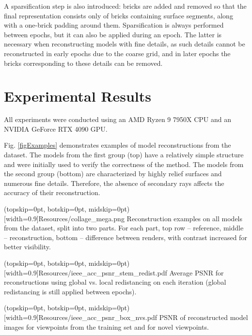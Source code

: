 \documentclass{ieeeaccess}
\begin{document}
A sparsification step is also introduced: bricks are added and removed so that the final representation consists only of bricks containing surface segments, along with a one-brick padding around them. Sparsification is always performed between epochs, but it can also be applied during an epoch. The latter is necessary when reconstructing models with fine details, as such details cannot be reconstructed in early epochs due to the coarse grid, and in later epochs the bricks corresponding to these details can be removed.

\section{Experimental Results}

All experiments were conducted using an AMD Ryzen 9 7950X CPU and an NVIDIA GeForce RTX 4090 GPU.

Fig. \ref{figExamples} demonstrates examples of model reconstructions from the dataset. The models from the first group (top) have a relatively simple structure and were initially used to verify the correctness of the method. The models from the second group (bottom) are characterized by highly relief surfaces and numerous fine details. Therefore, the absence of secondary rays affects the accuracy of their reconstruction.

\Figure[h](topskip=0pt, botskip=0pt, midskip=0pt)[width=0.9\textwidth]{Resources/collage_mega.png} {
    Reconstruction examples on all models from the dataset, split into two parts. For each part, top row -- reference, middle -- reconstruction, bottom -- difference between renders, with contrast increased for better visibility.\label{figExamples}
}

\Figure[h!](topskip=0pt, botskip=0pt, midskip=0pt)[width=0.9\textwidth]{Resources/ieee_acc_psnr_stem_redist.pdf} {
    Average PSNR for reconstructions using global vs. local redistancing on each iteration (global redistancing is still applied between epochs). \label{figPSNRRedist}
}

\Figure[t](topskip=0pt, botskip=0pt, midskip=0pt)[width=0.9\textwidth]{Resources/ieee_acc_psnr_box_nvs.pdf} {
    PSNR of reconstructed model images for viewpoints from the training set and for novel viewpoints. \label{figNVS}
}
\end{document}
